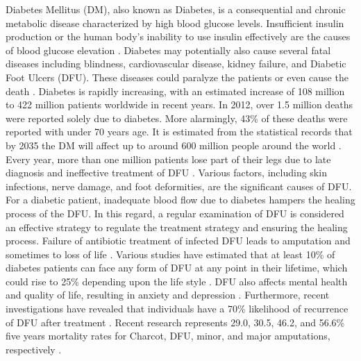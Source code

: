 \documentclass[review]{elsarticle}
\begin{document}
	Diabetes Mellitus (DM), also known as Diabetes, is a consequential and chronic metabolic disease characterized by high blood glucose levels. Insufficient insulin production or the human body’s inability to use insulin effectively are the causes of blood glucose elevation \cite{jeffcoate2003diabetic}. Diabetes may potentially also cause several fatal diseases including blindness, cardiovascular disease, kidney failure, and Diabetic Foot Ulcers (DFU). These diseases could paralyze the patients or even cause the death \cite{wild2004global}. Diabetes is rapidly increasing, with an estimated increase of 108 million to 422 million patients worldwide in recent years. In 2012, over 1.5 million deaths were reported solely due to diabetes. More alarmingly, 43\% of these deaths were reported with under 70 years age. It is estimated from the statistical records that by 2035 the DM will affect up to around 600 million people around the world \cite{bakker20162015}.
\newline\indent Every year, more than one million patients lose part of their legs due to late diagnosis and ineffective treatment of DFU \cite{armstrong1998validation}. Various factors, including skin infections, nerve damage, and foot deformities, are the significant causes of DFU. For a diabetic patient, inadequate blood flow due to diabetes hampers the healing process of the DFU. In this regard, a regular examination of DFU is considered an effective strategy to regulate the treatment strategy and ensuring the healing process. Failure of antibiotic treatment of infected DFU leads to amputation and sometimes to loss of life  \cite{ghanassia2008long}. Various studies have estimated that at least 10\% of diabetes patients can face any form of DFU at any point in their lifetime, which could rise to 25\% depending upon the life style \cite{jeffcoate2003diabetic,cavanagh2005treatment}. DFU also affects mental health and quality of life, resulting in anxiety and depression \cite{ahmad2018anxiety}. Furthermore, recent investigations have revealed that individuals have a 70\% likelihood of recurrence of DFU after treatment \cite{ogurtsova2021cumulative}. Recent research represents 29.0, 30.5, 46.2, and 56.6\% five years mortality rates for Charcot, DFU, minor, and major amputations, respectively \cite{armstrong2020five}. 
\end{document}
